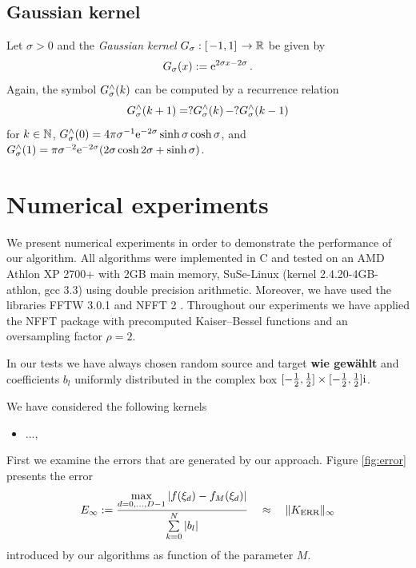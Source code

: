 \documentclass[11pt,a4paper,twoside,bibtotoc]{scrartcl}
\theoremstyle{plain}
\theoremstyle{definition}
\theoremstyle{remark}
\numberwithin{equation}{section}
\numberwithin{table}{section}
\numberwithin{figure}{section}
\begin{document}
\subsection{Gaussian kernel}
  Let $\sigma>0$ and the \emph{Gaussian kernel}
  $G_{\sigma}:\left[\left.-1,1\right]\right. \rightarrow \mathbb{R}$ be given by
  \begin{equation}
    \label{GaussKernel}
    \nonumber
    G_{\sigma}{\hspace{-0.4ex}}\left(x\right) := \mbox{\rm{e}}^{2\sigma x-2\sigma}\,.
  \end{equation}
  Again, the symbol $G_{\sigma}^{\wedge}{\hspace{-0.4ex}}\left(k\right)$ can be computed by a
  recurrence relation
  \[
  G_{\sigma}^{\wedge}{\hspace{-0.4ex}}\left(k+1\right) = ?
  G_{\sigma}^{\wedge}{\hspace{-0.4ex}}\left(k\right)   - ?
  G_{\sigma}^{\wedge}{\hspace{-0.4ex}}\left(k-1\right)
  \]
  for $k\in \mathbb{N}$, $G_{\sigma}^{\wedge}{\hspace{-0.4ex}}\left(0\right) = 4 \pi \sigma^{-1}
  \mbox{\rm{e}}^{-2\sigma} \sinh \sigma \cosh \sigma$, and $G_{\sigma}^{\wedge}{\hspace{-0.4ex}}\left(1\right) = \pi \sigma^{-2}
  \mbox{\rm{e}}^{-2\sigma} (2 \sigma \cosh 2 \sigma + \sinh \sigma )$.

\section{Numerical experiments}

We present numerical experiments in order to demonstrate the performance of
our algorithm.
All algorithms were implemented in C and tested on an AMD Athlon\texttrademark
XP 2700+ with 2GB main memory, SuSe-Linux (kernel 2.4.20-4GB-athlon, gcc 3.3)
using double precision arithmetic. 
Moreover, we have used the libraries FFTW 3.0.1 \cite{fftw} and NFFT 2
\cite{kupo02C}. 
Throughout our experiments we have applied the NFFT package \cite{kupo02C}
with precomputed Kaiser--Bessel functions and an oversampling factor $\rho=2$.

In our tests we have always chosen random source and target {\bf wie gewählt}
and coefficients $b_l$ uniformly distributed in the complex box
$[-\frac{1}{2},\frac{1}{2}]\times [-\frac{1}{2},\frac{1}{2}]{\rm i}$.

We have considered the following kernels

\begin{itemize}
\item ...,
\end{itemize}


First we examine the errors that are generated by our approach.
Figure \ref{fig:error} presents the error
\[
E_{\infty}:=
 \frac{\max\limits_{d=0,\ldots,D-1}\left|f{\hspace{-0.4ex}}\left(\xi_{d}\right)-
 f_{M}{\hspace{-0.4ex}}\left(\xi_{d}\right)\right|}{\sum\limits_{k=0}^N 
 |b_l|} \quad \approx \quad \|K_{\text{ERR}}\|_{\infty}
\]
introduced by our algorithms as function of the parameter $M$.
\end{document}
